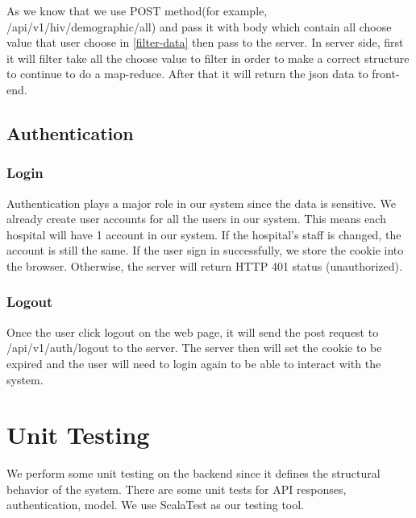             As we know that we use POST method(for example, /api/v1/hiv/demographic/all) and pass it with body which contain all choose value that user choose in \ref{filter-data} then pass to the server. In server side, first it will filter take all the choose value to filter in order to make a correct structure to continue to do a map-reduce. After that it will return the json data to front-end.
            
            
        
        
        \subsection{Authentication}
            \subsubsection{Login}
                Authentication plays a major role in our system since the data is sensitive. We already create user accounts for all the users in our system. This means each hospital will have 1 account in our system. If the hospital's staff is changed, the account is still the same. If the user sign in successfully, we store the cookie into the browser. Otherwise, the server will return HTTP 401 status (unauthorized).
            \subsubsection{Logout}
                Once the user click logout on the web page, it will send the post request to /api/v1/auth/logout to the server. The server then will set the cookie to be expired and the user will need to login again to be able to interact with the system.
        
        
    \section{Unit Testing}
        We perform some unit testing on the backend since it defines the structural behavior of the system. There are some unit tests for API responses, authentication, model. We use ScalaTest\cite{scalatest} as our testing tool.


